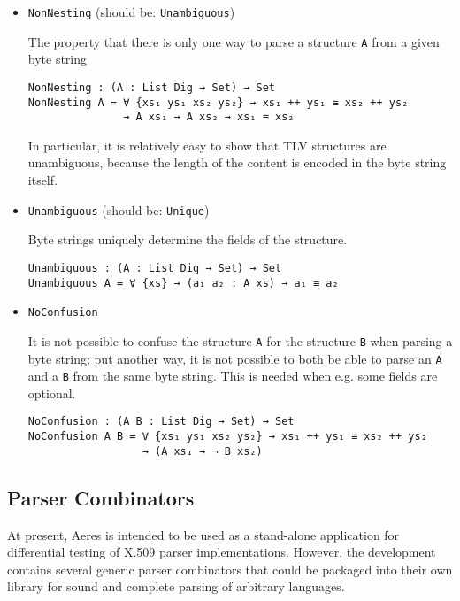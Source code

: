 \documentclass[11pt]{article}
\begin{document}
\begin{itemize}
\item \texttt{NonNesting} (should be: \texttt{Unambiguous})

The property that there is only one way to parse a structure \texttt{A} from a
given byte string

\begin{verbatim}
NonNesting : (A : List Dig → Set) → Set
NonNesting A = ∀ {xs₁ ys₁ xs₂ ys₂} → xs₁ ++ ys₁ ≡ xs₂ ++ ys₂
               → A xs₁ → A xs₂ → xs₁ ≡ xs₂
\end{verbatim}

In particular, it is relatively easy to show that TLV structures are
unambiguous, because the length of the content is encoded in the byte string
itself.

\item \texttt{Unambiguous} (should be: \texttt{Unique})

Byte strings uniquely determine the fields of the structure.

\begin{verbatim}
Unambiguous : (A : List Dig → Set) → Set
Unambiguous A = ∀ {xs} → (a₁ a₂ : A xs) → a₁ ≡ a₂
\end{verbatim}

\item \texttt{NoConfusion}

It is not possible to confuse the structure \texttt{A} for the structure \texttt{B} when
parsing a byte string; put another way, it is not possible to both be able
to parse an \texttt{A} and a \texttt{B} from the same byte string. This is needed when e.g.
some fields are optional.

\begin{verbatim}
NoConfusion : (A B : List Dig → Set) → Set
NoConfusion A B = ∀ {xs₁ ys₁ xs₂ ys₂} → xs₁ ++ ys₁ ≡ xs₂ ++ ys₂
                  → (A xs₁ → ¬ B xs₂)
\end{verbatim}
\end{itemize}

\subsection{Parser Combinators}
\label{sec:orgdac7de5}

At present, Aeres is intended to be used as a stand-alone application for
differential testing of X.509 parser implementations.
However, the development contains several generic parser combinators that
could be packaged into their own library for sound and complete parsing of
arbitrary languages.
\end{document}
